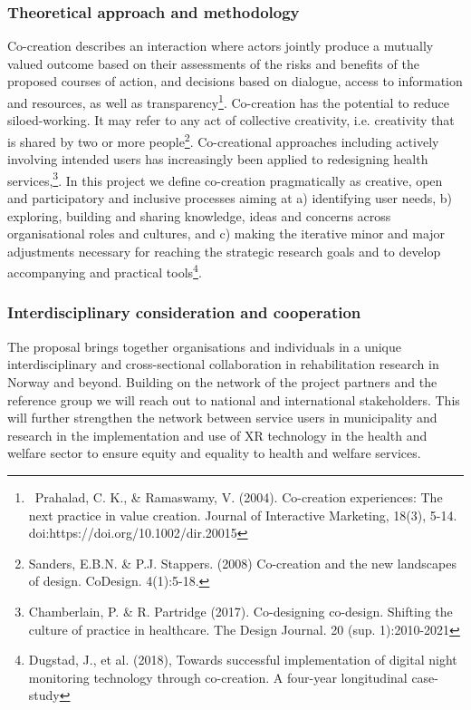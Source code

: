 \subsubsection{Theoretical approach and methodology}
Co-creation describes an interaction where actors jointly produce a mutually valued outcome based on their assessments
of the risks and benefits of the proposed courses of action, and decisions based on dialogue, access to information and
resources, as well as transparency\footnote{\ Prahalad, C. K., \& Ramaswamy, V. (2004). Co-creation experiences: The
next practice in value creation. Journal of Interactive Marketing, 18(3), 5-14. doi:https://doi.org/10.1002/dir.20015
}. Co-creation has the potential to reduce siloed-working. It may refer to any act of collective creativity, i.e.
creativity that is shared by two or more people\footnote{Sanders, E.B.N. \& P.J. Stappers. (2008) Co-creation and the
new landscapes of design. CoDesign. 4(1):5-18.}. Co-creational approaches including actively involving intended users
has increasingly been applied to redesigning health services,\footnote{Chamberlain, P. \& R. Partridge
(2017). Co-designing co-design. Shifting the culture of practice in healthcare. The Design
Journal. 20 (sup. 1):2010-2021}. In this project we define co-creation pragmatically as creative, open and participatory
and inclusive processes aiming at a) identifying user needs, b) exploring, building and sharing knowledge, ideas and
concerns across organisational roles and cultures, and c) making the iterative minor and major adjustments necessary
for reaching the strategic research goals and to develop accompanying and practical tools\footnote{Dugstad, J., et
al. (2018), Towards successful implementation of digital night monitoring technology through co-creation. A four-year
longitudinal case-study}.


\subsubsection{Interdisciplinary consideration and cooperation}
The proposal brings together organisations and individuals in a unique interdisciplinary and cross-sectional
collaboration in rehabilitation research in Norway and beyond. Building on the network of the project partners and the
reference group we will reach out to national and international stakeholders. This will further strengthen the network
between service users in municipality and research in the implementation and use of XR technology in the health and
welfare sector to ensure equity and equality to health and welfare services.


